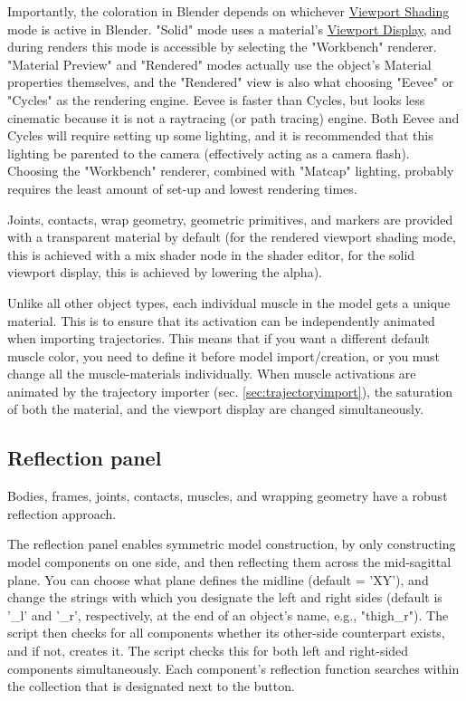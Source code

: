 \documentclass{article}
\begin{document}
Importantly, the coloration in Blender depends on whichever \href{https://docs.blender.org/manual/en/latest/editors/3dview/display/shading.html}{Viewport Shading} mode is active in Blender. "Solid" mode uses a material's \href{https://docs.blender.org/manual/en/latest/render/workbench/display_settings.html#properties-material-viewport-display}{Viewport Display}, and during renders this mode is accessible by selecting the "Workbench" renderer. "Material Preview" and "Rendered" modes actually use the object's Material properties themselves, and the "Rendered" view is also what choosing "Eevee" or "Cycles" as the rendering engine. Eevee is faster than Cycles, but looks less cinematic because it is not a raytracing (or path tracing) engine. Both Eevee and Cycles will require setting up some lighting, and it is recommended that this lighting be parented to the camera (effectively acting as a camera flash). Choosing the "Workbench" renderer, combined with "Matcap" lighting, probably requires the least amount of set-up and lowest rendering times.

Joints, contacts, wrap geometry, geometric primitives, and markers are provided with a transparent material by default (for the rendered viewport shading mode, this is achieved with a mix shader node in the shader editor, for the solid viewport display, this is achieved by lowering the alpha).

Unlike all other object types, each individual muscle in the model gets a unique material. This is to ensure that its activation can be independently animated when importing trajectories. This means that if you want a different default muscle color, you need to define it before model import/creation, or you must change all the muscle-materials individually. When muscle activations are animated by the trajectory importer (sec. \ref{sec:trajectoryimport}), the saturation of both the material, and the viewport display are changed simultaneously.

\subsection{Reflection panel}
\label{sec:reflectionpanel}
Bodies, frames, joints, contacts, muscles, and wrapping geometry have a robust reflection approach.

The reflection panel enables symmetric model construction, by only constructing model components on one side, and then reflecting them across the mid-sagittal plane. You can choose what plane defines the midline (default = 'XY'), and change the strings with which you designate the left and right sides (default is '\_l' and '\_r', respectively, at the end of an object's name, e.g., "thigh\_r"). The script then checks for all components whether its other-side counterpart exists, and if not, creates it. The script checks this for both left and right-sided components simultaneously. Each component's reflection function searches within the collection that is designated next to the button.
\end{document}
